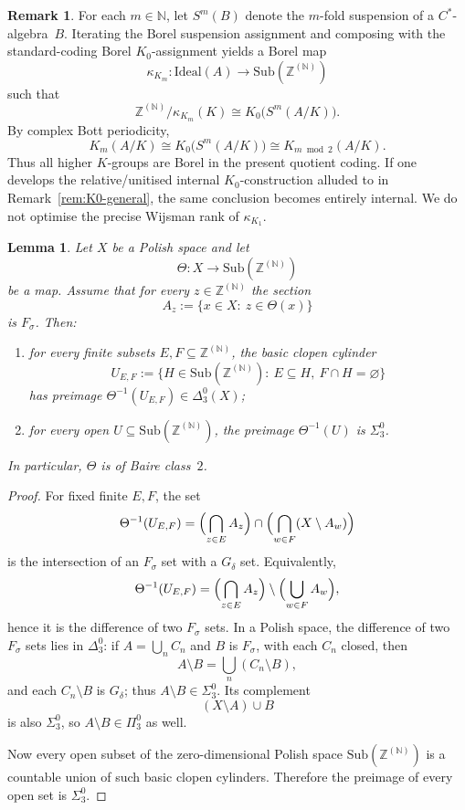 \documentclass[12pt,fleqn,a4paper]{amsart}
\numberwithin{equation}{section}
\newtheorem{lemma}[theorem]{Lemma}
\theoremstyle{definition}
\newtheorem{remark}[theorem]{Remark}
\newcommand{\N}{\mathbb{N}}
\newcommand{\Z}{\mathbb{Z}}
\newcommand{\Ideal}{\mathrm{Ideal}}
\newcommand{\Sub}{\mathrm{Sub}}
\begin{document}
\begin{remark}
\label{rem:Kn-KOn}
For each $m\in\N$, let $S^{m}(B)$ denote the $m$-fold suspension of a $C^*$-algebra~$B$.
Iterating the Borel suspension assignment and composing with the standard-coding
Borel $K_0$-assignment yields a Borel map
\[
\kappa_{K_m}:\Ideal(A)\to\Sub(\Z^{(\N)})
\]
such that
\[
\Z^{(\N)}/\kappa_{K_m}(K)\cong K_0\bigl(S^{m}(A/K)\bigr).
\]
By complex Bott periodicity,
\[
K_m(A/K)\cong K_0\bigl(S^{m}(A/K)\bigr)\cong K_{m\bmod 2}(A/K).
\]
Thus all higher $K$-groups are Borel in the present quotient coding.
If one develops the relative/unitised internal $K_0$-construction alluded to in
Remark~\ref{rem:K0-general}, the same conclusion becomes entirely internal.
We do not optimise the precise Wijsman rank of $\kappa_{K_1}$.
\end{remark}

\begin{lemma}
\label{lem:Sub-map-complexity}
Let $X$ be a Polish space and let
\[
\Theta:X\to\Sub(\Z^{(\N)})
\]
be a map.
Assume that for every $z\in\Z^{(\N)}$ the section
\[
A_z:=\{x\in X:\ z\in \Theta(x)\}
\]
is $F_\sigma$.
Then:
\begin{enumerate}
\item for every finite subsets $E,F\subseteq \Z^{(\N)}$, the basic clopen cylinder
\[
U_{E,F}:=\{H\in\Sub(\Z^{(\N)}):\ E\subseteq H,\ F\cap H=\varnothing\}
\]
has preimage $\Theta^{-1}(U_{E,F})\in\Delta^0_3(X)$;
\item for every open $U\subseteq \Sub(\Z^{(\N)})$, the preimage $\Theta^{-1}(U)$ is
$\Sigma^0_3$.
\end{enumerate}
In particular, $\Theta$ is of Baire class~$2$.
\end{lemma}

\begin{proof}
For fixed finite $E,F$, the set
\[
\Theta^{-1}(U_{E,F})
=
\Bigl(\bigcap_{z\in E}A_z\Bigr)\cap
\Bigl(\bigcap_{w\in F}(X\setminus A_w)\Bigr)
\]
is the intersection of an $F_\sigma$ set with a $G_\delta$ set.
Equivalently,
\[
\Theta^{-1}(U_{E,F})
=
\Bigl(\bigcap_{z\in E}A_z\Bigr)\setminus
\Bigl(\bigcup_{w\in F}A_w\Bigr),
\]
hence it is the difference of two $F_\sigma$ sets.
In a Polish space, the difference of two $F_\sigma$ sets lies in $\Delta^0_3$:
if $A=\bigcup_n C_n$ and $B$ is $F_\sigma$, with each $C_n$ closed, then
\[
A\setminus B=\bigcup_n (C_n\setminus B),
\]
and each $C_n\setminus B$ is $G_\delta$; thus $A\setminus B\in\Sigma^0_3$.
Its complement
\[
(X\setminus A)\cup B
\]
is also $\Sigma^0_3$, so $A\setminus B\in\Pi^0_3$ as well.

Now every open subset of the zero-dimensional Polish space
$\Sub(\Z^{(\N)})$ is a countable union of such basic clopen cylinders.
Therefore the preimage of every open set is $\Sigma^0_3$.
\end{proof}
\end{document}
